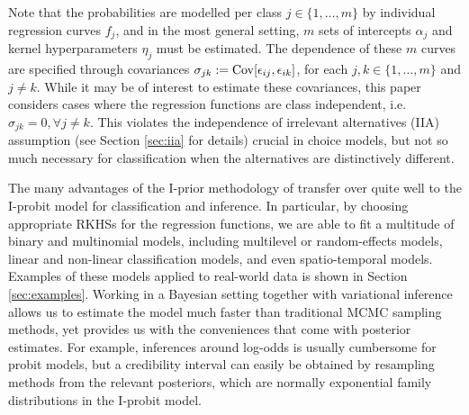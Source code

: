 \documentclass[a4paper,showframe,11pt]{report}
\begin{document}
Note that the probabilities are modelled per class $j\in\{1,\dots,m\}$ by individual regression curves $f_j$, and in the most general setting, $m$ sets of intercepts $\alpha_j$ and kernel hyperparameters $\eta_j$ must be estimated.
The dependence of these $m$ curves are specified through covariances $\sigma_{jk} := \operatorname{Cov}[\epsilon_{ij}, \epsilon_{ik}]$, 
for each $j,k\in\{1,\dots,m\}$ and $j\neq k$.
While it may be of interest to estimate these covariances, this paper considers cases where the regression functions are class independent, i.e. $\sigma_{jk} = 0,\forall j \neq k$.
This violates the independence of irrelevant alternatives (IIA) assumption (see Section \ref{sec:iia} for details) crucial in choice models, but not so much necessary for classification when the alternatives are distinctively different.



The many advantages of the I-prior methodology of \cite{jamil2017} transfer over quite well to the I-probit model for classification and inference.
In particular, by choosing appropriate RKHSs for the regression functions, we are able to fit a multitude of binary and multinomial models, including multilevel or random-effects models, linear and non-linear classification models, and even spatio-temporal models.
Examples of these models applied to real-world data is shown in Section \ref{sec:examples}.
Working in a Bayesian setting together with variational inference allows us to estimate the model much faster than traditional MCMC sampling methods, yet provides us with the conveniences that come with posterior estimates.
For example, inferences around log-odds is usually cumbersome for probit models, but a credibility interval can easily be obtained by resampling methods from the relevant posteriors, which are normally exponential family distributions in the I-probit model.
\end{document}
